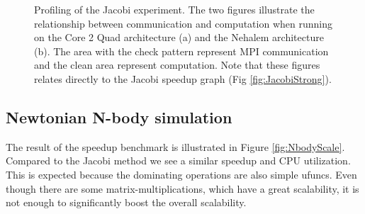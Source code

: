 \documentclass{sigplanconf}
\begin{document}
\begin{figure}[p]%
  \begin{center}%
    \caption{Profiling of the Jacobi experiment. The two figures illustrate the relationship between communication and computation when running on the Core 2 Quad architecture (a) and the Nehalem architecture (b). The area with the check pattern represent MPI communication and the clean area represent computation. Note that these figures relates directly to the Jacobi speedup graph (Fig \ref{fig:JacobiStrong}).}
    \label{fig:JacobiProfiling}%
  \end{center}
\end{figure}


\subsection{Newtonian N-body simulation}
The result of the speedup benchmark is illustrated in Figure \ref{fig:NbodyScale}. Compared to the Jacobi method we see a similar speedup and CPU utilization. This is expected because the dominating operations are also simple ufuncs. Even though there are some matrix-multiplications, which have a great scalability, it is not enough to significantly boost the overall scalability.
\end{document}
